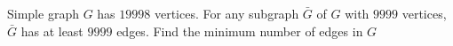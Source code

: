 Simple graph $G$ has $19998$ vertices. For any subgraph $\bar G$ of $G$ with $9999$ vertices, $\bar G$ has at least $9999$ edges. Find the minimum number of edges in $G$